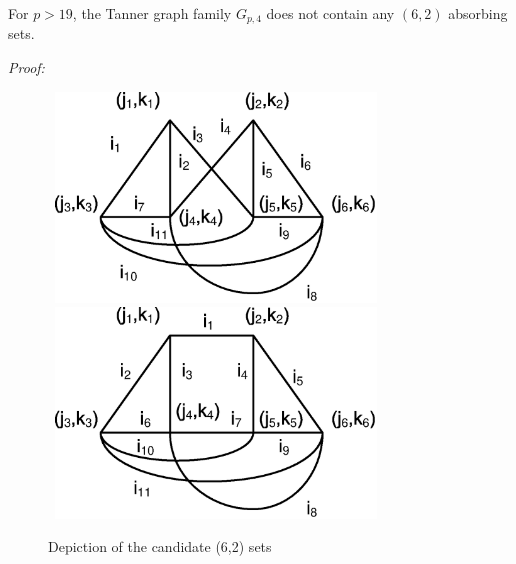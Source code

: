 \begin{lemma}\label{Lem4} For $p>19$, the Tanner graph family $G_{p,4}$ does not contain any $(6,2)$ absorbing sets.
\end{lemma}

\noindent \textit{Proof:}
\begin{figure}
\center\includegraphics[width=3.5in,height=2.2in]{Drawing30_2.eps}
\newline
\center\includegraphics[width=3.5in,height=2.2in]{Drawing32_1.eps}\hspace{0.3in}
\caption{Depiction of the candidate (6,2) sets} \label{fig62}
\end{figure}

